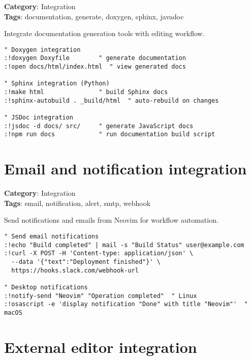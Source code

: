 {{{{{{\textbf{Category}: Integration\\ \textbf{Tags}: documentation, generate, doxygen, sphinx, javadoc
\vspace{0.5cm}

Integrate documentation generation tools with editing workflow.

\begin{Exa*}{}
\begin{Verbatim}[fontsize=\footnotesize, breaklines, breakanywhere]
" Doxygen integration
:!doxygen Doxyfile        " generate documentation
:!open docs/html/index.html  " view generated docs

" Sphinx integration (Python)
:!make html               " build Sphinx docs
:!sphinx-autobuild . _build/html  " auto-rebuild on changes

" JSDoc integration
:!jsdoc -d docs/ src/     " generate JavaScript docs
:!npm run docs            " run documentation build script
\end{Verbatim}
\end{Exa*}

\section{Email and notification integration}

\textbf{Category}: Integration\\ \textbf{Tags}: email, notification, alert, smtp, webhook
\vspace{0.5cm}

Send notifications and emails from Neovim for workflow automation.

\begin{Exa*}{}
\begin{Verbatim}[fontsize=\footnotesize, breaklines, breakanywhere]
" Send email notifications
:!echo "Build completed" | mail -s "Build Status" user@example.com
:!curl -X POST -H 'Content-type: application/json' \
  --data '{"text":"Deployment finished"}' \
  https://hooks.slack.com/webhook-url

" Desktop notifications
:!notify-send "Neovim" "Operation completed"  " Linux
:!osascript -e 'display notification "Done" with title "Neovim"'  " macOS
\end{Verbatim}
\end{Exa*}

\section{External editor integration}

}}}}}}
